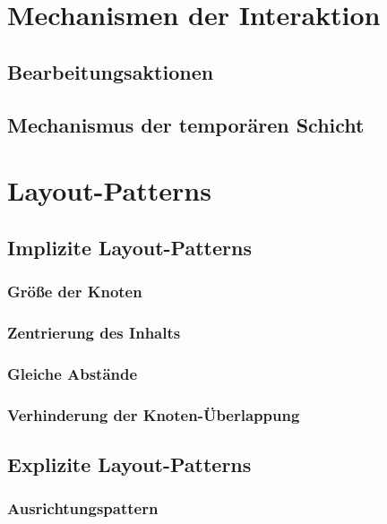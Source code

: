 \section{Mechanismen der Interaktion}
\label{sec:interaction-mechanisms}

\subsection{Bearbeitungsaktionen}
\label{subsec:edit-actions}

\subsection{Mechanismus der temporären Schicht}
\label{subsec:temporary-layer-mechanism}


\section{Layout-Patterns}
\label{sec:layout-patterns}

\subsection{Implizite Layout-Patterns}
\label{subsec:implicit-layout-patterns}

\subsubsection{Größe der Knoten}
\subsubsection{Zentrierung des Inhalts}
\subsubsection{Gleiche Abstände}
\subsubsection{Verhinderung der Knoten-Überlappung}

\subsection{Explizite Layout-Patterns}
\label{subsec:explicit-layout-patterns}

\subsubsection{Ausrichtungspattern}
